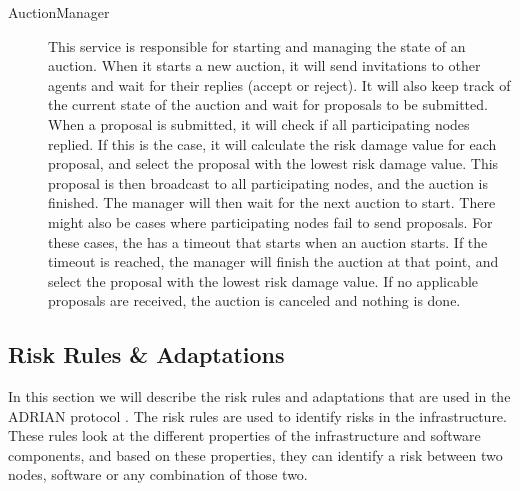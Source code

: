 \begin{description}
    \item[AuctionManager] This service is responsible for starting and managing the state of an auction. When it starts a new auction, it will send invitations to other agents and wait for their replies (accept or reject). It will also keep track of the current state of the auction and wait for proposals to be submitted. When a proposal is submitted, it will check if all participating nodes replied. If this is the case, it will calculate the risk damage value for each proposal, and select the proposal with the lowest risk damage value. This proposal is then broadcast to all participating nodes, and the auction is finished. The manager will then wait for the next auction to start. There might also be cases where participating nodes fail to send proposals. For these cases, the  has a timeout that starts when an auction starts. If the timeout is reached, the manager will finish the auction at that point, and select the proposal with the lowest risk damage value. If no applicable proposals are received, the auction is canceled and nothing is done.
\end{description}




\subsection{Risk Rules \& Adaptations}
\label{ssec:risk-rules-adaptaions}
In this section we will describe the risk rules and adaptations that are used in the ADRIAN protocol \cite{mann2023ADRIAN}. The risk rules are used to identify risks in the infrastructure. These rules look at the different properties of the infrastructure and software components, and based on these properties, they can identify a risk between two nodes, software or any combination of those two. 

